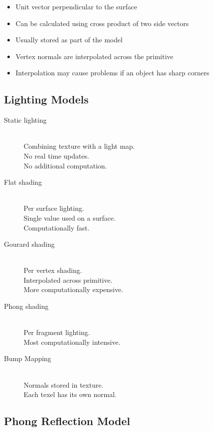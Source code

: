 \documentclass[a4paper]{article}
\begin{document}
\begin{itemize}
  \item Unit vector perpendicular to the surface
  \item Can be calculated using cross product of two side vectors
  \item Usually stored as part of the model
  \item Vertex normals are interpolated across the primitive
  \item Interpolation may cause problems if an object has sharp corners
\end{itemize}

\subsection{Lighting Models}

\begin{description}
  \item[Static lighting] \hfill \\
    Combining texture with a light map. \\
    No real time updates. \\
    No additional computation.

  \item[Flat shading] \hfill \\
    Per surface lighting. \\
    Single value used on a surface. \\
    Computationally fast.

  \item[Gourard shading] \hfill \\
    Per vertex shading. \\
    Interpolated across primitive. \\
    More computationally expensive.

  \item[Phong shading] \hfill \\
    Per fragment lighting. \\
    Most computationally intensive.

  \item[Bump Mapping] \hfill \\
    Normals stored in texture. \\
    Each texel has its own normal.

\end{description}

\subsection{Phong Reflection Model}
\end{document}
